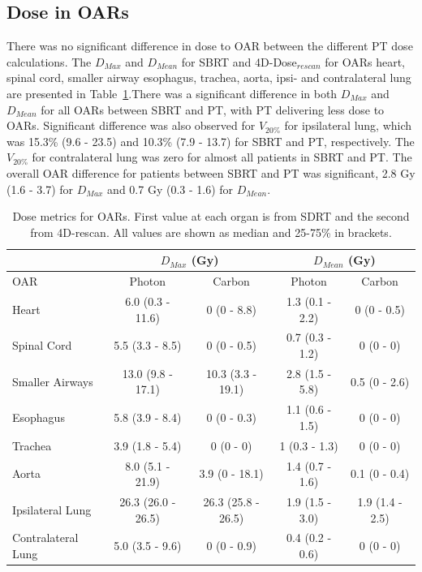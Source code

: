 \documentclass[type=dr, dr=rernat, acm$^3$entcolor=tud7b,colorbacktitle, bigchapter, openright, twoside, 12pt ]{tudthesis}
\begin{document}
\subsection{Dose in OARs}


There was no significant difference in dose to OAR between the different PT dose calculations. 
The $D_{Max}$ and $D_{Mean}$ for SBRT and 4D-Dose$_{rescan}$ for OARs heart, spinal cord, smaller airway esophagus, trachea, aorta, ipsi- and contralateral lung are 
presented in Table~\ref{tab:results}.There was a significant difference in both $D_{Max}$ and $D_{Mean}$ for all OARs between SBRT and PT, with 
PT delivering less dose to OARs. Significant difference was also observed for $V_{20\%}$ for ipsilateral lung, which was 15.3\% (9.6 - 23.5) and 10.3\% (7.9 - 13.7) for SBRT and PT, 
respectively. The $V_{20\%}$ for contralateral lung was zero for almost all patients in SBRT and PT. The overall OAR difference for patients between SBRT and PT 
was significant, 2.8 Gy (1.6 - 3.7)  for $D_{Max}$ and 0.7 Gy (0.3 - 1.6) for $D_{Mean}$. 



\begin{table}[H]
  \centering
  \caption{Dose metrics for OARs. First value at each organ is from SDRT and the second from 4D-rescan. All values are shown as median and 25-75\% in brackets.}
  \begin{tabular}{l|c|c|c|c|}
    \cline{2-5}
     & \multicolumn{2}{|c|}{$D_{Max}$ (Gy)} & \multicolumn{2}{|c|}{$D_{Mean}$ (Gy)} \\
     \hline
    \multicolumn{1}{|l|}{OAR} & Photon & Carbon & Photon & Carbon	\\
    \hline
\multicolumn{1}{|l|}{Heart} & 6.0 (0.3 - 11.6) & 0 (0 - 8.8)	& 1.3 (0.1 - 2.2) & 	0 (0 - 0.5) \\
\multicolumn{1}{|l|}{Spinal Cord} &	5.5 (3.3 - 8.5)	& 0 (0 - 0.5) &	0.7 (0.3 - 1.2) &	0 (0 - 0) \\
\multicolumn{1}{|l|}{Smaller Airways} & 13.0 (9.8 - 17.1) &	10.3 (3.3 - 19.1) &	2.8 (1.5 - 5.8) &	0.5 (0 - 2.6) \\
\multicolumn{1}{|l|}{Esophagus} & 5.8 (3.9 - 8.4) &	0 (0 - 0.3) &	1.1 (0.6 - 1.5) &	0 (0 - 0)\\
\multicolumn{1}{|l|}{Trachea} &3.9 (1.8 - 5.4) &	0 (0 - 0) &	1 (0.3 - 1.3) &	0 (0 - 0)\\
\multicolumn{1}{|l|}{Aorta} & 8.0 (5.1 - 21.9) &	3.9 (0 - 18.1) &	1.4 (0.7 - 1.6) &	0.1 (0 - 0.4)\\
\multicolumn{1}{|l|}{Ipsilateral Lung} & 26.3 (26.0 - 26.5) &	26.3 (25.8 - 26.5) &	1.9 (1.5 - 3.0) &	1.9 (1.4 - 2.5)\\
\multicolumn{1}{|l|}{Contralateral Lung} & 5.0 (3.5 - 9.6) &	0 (0 - 0.9) &	0.4 (0.2 - 0.6) &	0 (0 - 0) \\
    \hline\hline
  \end{tabular}
  \label{tab:results}
\end{table}
\end{document}
